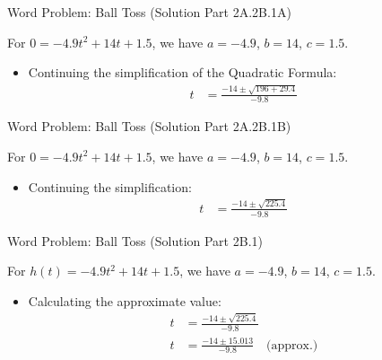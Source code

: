 \documentclass[aspectratio=169]{beamer}
\begin{document}
\begin{frame}{Word Problem: Ball Toss (Solution Part 2A.2B.1A)}
    \begin{tcolorbox}[colback=lightgray,colframe=accent,title=Solution 2A.2B.1A: Simplify Square Root]
        \footnotesize
        For $0 = -4.9t^2 + 14t + 1.5$, we have $a=-4.9$, $b=14$, $c=1.5$.
        \begin{itemize}
            \item Continuing the simplification of the Quadratic Formula:
                \begin{align*}
                    t &= \frac{-14 \pm \sqrt{196 + 29.4}}{-9.8}
                \end{align*}
        \end{itemize}
    \end{tcolorbox}
\end{frame}

\begin{frame}{Word Problem: Ball Toss (Solution Part 2A.2B.1B)}
    \begin{tcolorbox}[colback=lightgray,colframe=accent,title=Solution 2A.2B.1B: Intermediate Result]
        \footnotesize
        For $0 = -4.9t^2 + 14t + 1.5$, we have $a=-4.9$, $b=14$, $c=1.5$.
        \begin{itemize}
            \item Continuing the simplification:
                \begin{align*}
                    t &= \frac{-14 \pm \sqrt{225.4}}{-9.8}
                \end{align*}
        \end{itemize}
    \end{tcolorbox}
\end{frame}

\begin{frame}{Word Problem: Ball Toss (Solution Part 2B.1)}
    \begin{tcolorbox}[colback=lightgray,colframe=accent,title=Solution Part 2B.1: Approximate Value]
        \footnotesize
        For $h(t) = -4.9t^2 + 14t + 1.5$, we have $a=-4.9$, $b=14$, $c=1.5$.
        \begin{itemize}
            \item Calculating the approximate value:
                \begin{align*}
                    t &= \frac{-14 \pm \sqrt{225.4}}{-9.8} \\
                    t &= \frac{-14 \pm 15.013}{-9.8} \quad \text{(approx.)}
                \end{align*}
        \end{itemize}
    \end{tcolorbox}
\end{frame}
\end{document}
